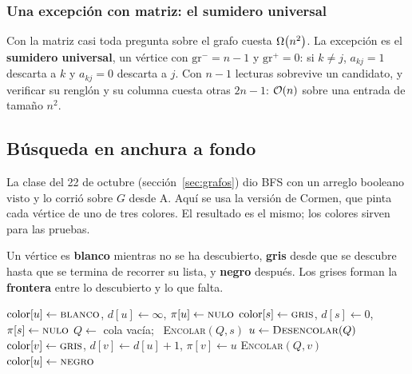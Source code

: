 \documentclass[11pt,letterpaper]{article}
\begin{document}
\subsubsection*{Una excepción con matriz: el sumidero universal}

Con la matriz casi toda pregunta sobre el grafo cuesta $\Omega\!\left(n^2\right)$.
La excepción es el \textbf{sumidero universal}, un vértice con
$\text{gr}^{-} = n - 1$ y $\text{gr}^{+} = 0$: si $k \neq j$,
$a_{kj} = 1$ descarta a $k$ y $a_{kj} = 0$ descarta a $j$. Con
$n - 1$ lecturas sobrevive un candidato, y verificar su renglón y su
columna cuesta otras $2n - 1$: $\mathcal{O}\!\left(n\right)$ sobre una entrada de tamaño
$n^2$.


\subsection*{Búsqueda en anchura a fondo}

La clase del 22 de octubre (sección~\ref{sec:grafos}) dio BFS con un
arreglo booleano $\text{visto}$ y lo corrió sobre $G$ desde A. Aquí se
usa la versión de Cormen, que pinta cada vértice de uno de tres
colores. El resultado es el mismo; los colores sirven para las
pruebas.

\begin{definicion}
  Un vértice es \textbf{blanco} mientras no se ha descubierto,
  \textbf{gris} desde que se descubre hasta que se termina de recorrer
  su lista, y \textbf{negro} después. Los grises forman la
  \textbf{frontera} entre lo descubierto y lo que falta.
\end{definicion}

\begin{algorithm}[H]
\caption{\textsc{BFS}$(G, s)$ con colores (Cormen, sección 22.2)}
\label{alg:bfs-colores}
\begin{algorithmic}[1]
    \State $\text{color}[u] \gets \textsc{blanco}$, \quad
           $d[u] \gets \infty$, \quad $\pi[u] \gets \textsc{nulo}$
  \EndFor
  \State $\text{color}[s] \gets \textsc{gris}$, \quad $d[s] \gets 0$,
         \quad $\pi[s] \gets \textsc{nulo}$
  \State $Q \gets$ cola vacía; \ \textsc{Encolar}$(Q, s)$
    \State $u \gets \textsc{Desencolar}(Q)$
       
        \State $\text{color}[v] \gets \textsc{gris}$, \quad
               $d[v] \gets d[u] + 1$, \quad $\pi[v] \gets u$
        \State \textsc{Encolar}$(Q, v)$
      \EndIf
    \EndFor
    \State $\text{color}[u] \gets \textsc{negro}$
  \EndWhile
\EndProcedure
\end{algorithmic}
\end{algorithm}
\end{document}
